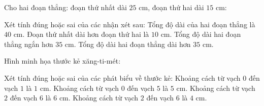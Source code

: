 \begin{ex} %
Cho hai đoạn thẳng: đoạn thứ nhất dài $25\text{ cm}$, đoạn thứ hai dài $15\text{ cm}$:
\begin{center}
\end{center}
Xét tính đúng hoặc sai của các nhận xét sau:
\choiceTF
{\True Tổng độ dài của hai đoạn thẳng là $40\text{ cm}$.}
{\True Đoạn thứ nhất dài hơn đoạn thứ hai là $10\text{ cm}$.}
{Tổng độ dài hai đoạn thẳng ngắn hơn $35\text{ cm}$.}
{\True Tổng độ dài hai đoạn thẳng dài hơn $35\text{ cm}$.}
\end{ex}

\begin{ex} %
Hình minh họa thước kẻ xăng-ti-mét:
\begin{center}
\end{center}
Xét tính đúng hoặc sai của các phát biểu về thước kẻ:
\choiceTF
{\True Khoảng cách từ vạch $0$ đến vạch $1$ là $1\text{ cm}$.}
{\True Khoảng cách từ vạch $0$ đến vạch $5$ là $5\text{ cm}$.}
{Khoảng cách từ vạch $2$ đến vạch $6$ là $6\text{ cm}$.}
{\True Khoảng cách từ vạch $2$ đến vạch $6$ là $4\text{ cm}$.}
\end{ex}

